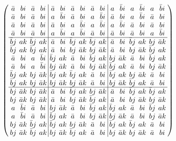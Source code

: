 \documentclass{beamer}
\begin{document}
\begin{frame}

  \[
    \arraycolsep=2.0pt\def\arraystretch{0.75}
    \left(
      \begin{array}{cccc|cccccc|cccccc}
        \bar{a}&bi&\bar{a}&bi&\bar{a}&bi&\bar{a}&bi&\bar{a}&bi& a&\bar{b}i& a&\bar{b}i& a&\bar{b}i\\
        \bar{a}&bi&\bar{a}&bi& a&\bar{b}i&\bar{a}&bi& a&\bar{b}i&\bar{a}&bi& a&\bar{b}i&\bar{a}&bi\\
        \bar{a}&bi&\bar{a}&bi&\bar{a}&bi& a&\bar{b}i& a&\bar{b}i& a&\bar{b}i&\bar{a}&bi&\bar{a}&bi\\
        \bar{a}&bi&\bar{a}&bi& a&\bar{b}i& a&\bar{b}i&\bar{a}&bi&\bar{a}&bi&\bar{a}&bi& a&\bar{b}i\\\hline
        \bar{b}j&ak&\bar{b}j&ak&\bar{a}&bi&\bar{b}j&ak&\bar{b}j&ak&\bar{a}&bi&\bar{b}j&ak&bj&\bar{a}k\\
        \bar{b}j&ak&\bar{b}j&ak&\bar{a}&bi&bj&\bar{a}k&bj&\bar{a}k&\bar{a}&bi&bj&\bar{a}k&\bar{b}j&ak\\
        \bar{a}&bi& a&\bar{b}i&\bar{b}j&ak&\bar{a}&bi&\bar{b}j&ak&bj&\bar{a}k&\bar{a}&bi&\bar{b}j&ak\\
        \bar{a}&bi& a&\bar{b}i&bj&\bar{a}k&\bar{a}&bi&bj&\bar{a}k&\bar{b}j&ak&\bar{a}&bi&bj&\bar{a}k\\
        \bar{b}j&ak&bj&\bar{a}k&\bar{b}j&ak&\bar{b}j&ak&\bar{a}&bi&\bar{b}j&ak&bj&\bar{a}k&\bar{a}&bi\\
        \bar{b}j&ak&bj&\bar{a}k&bj&\bar{a}k&bj&\bar{a}k&\bar{a}&bi&bj&\bar{a}k&\bar{b}j&ak&\bar{a}&bi\\\hline
        bj&\bar{a}k&bj&\bar{a}k&\bar{a}&bi&\bar{b}j&ak&bj&\bar{a}k&\bar{a}&bi&\bar{b}j&ak&\bar{b}j&ak\\
        bj&\bar{a}k&bj&\bar{a}k&\bar{a}&bi&bj&\bar{a}k&\bar{b}j&ak&\bar{a}&bi&bj&\bar{a}k&bj&\bar{a}k\\
        a&\bar{b}i&\bar{a}&bi&bj&\bar{a}k&\bar{a}&bi&\bar{b}j&ak&\bar{b}j&ak&\bar{a}&bi&\bar{b}j&ak\\
        a&\bar{b}i&\bar{a}&bi&\bar{b}j&ak&\bar{a}&bi&bj&\bar{a}k&bj&\bar{a}k&\bar{a}&bi&bj&\bar{a}k\\
        bj&\bar{a}k&\bar{b}j&ak&\bar{b}j&ak&bj&\bar{a}k&\bar{a}&bi&\bar{b}j&ak&\bar{b}j&ak&\bar{a}&bi\\
        bj&\bar{a}k&\bar{b}j&ak&bj&\bar{a}k&\bar{b}j&ak&\bar{a}&bi&bj&\bar{a}k&bj&\bar{a}k&\bar{a}&bi\\
      \end{array}
    \right)
  \]
  
\end{frame}
\end{document}

